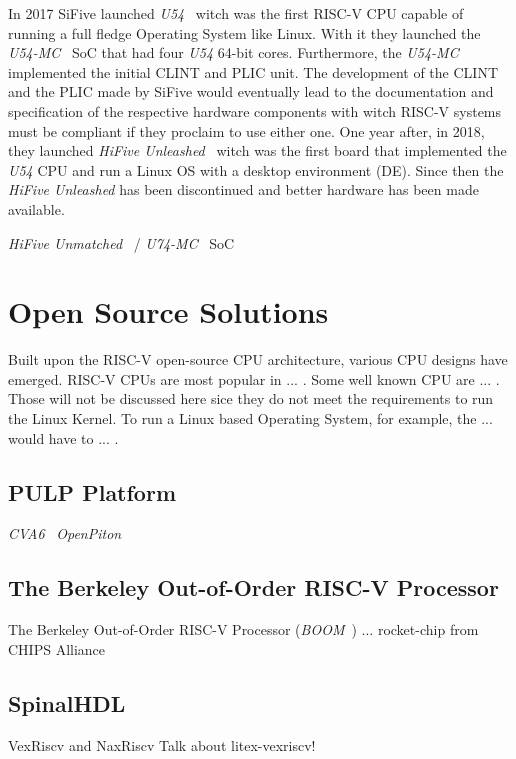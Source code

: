 In 2017 SiFive launched \textit{U54}~\cite{u54} witch was the first RISC-V CPU capable of running a full fledge Operating System like Linux. With it they launched the \textit{U54-MC}~\cite{u54-mc} SoC that had four \textit{U54} 64-bit cores. Furthermore, the \textit{U54-MC} implemented the initial CLINT and PLIC unit. The development of the CLINT and the PLIC made by SiFive would eventually lead to the documentation and specification of the respective hardware components with witch RISC-V systems must be compliant if they proclaim to use either one. One year after, in 2018, they launched \textit{HiFive Unleashed}~\cite{hifive_unleashed} witch was the first board that implemented the \textit{U54} CPU and run a Linux OS with a desktop environment (DE). Since then the \textit{HiFive Unleashed} has been discontinued and better hardware has been made available.

\textit{HiFive Unmatched}~\cite{hifive_unmatched} / \textit{U74-MC}~\cite{u74-mc} SoC

\section{Open Source Solutions}
Built upon the RISC-V open-source CPU architecture, various CPU designs have emerged. RISC-V CPUs are most popular in ... . Some well known CPU are ... . Those will not be discussed here sice they do not meet the requirements to run the Linux Kernel. To run a Linux based Operating System, for example, the ... would have to ... .

\subsection{PULP Platform}
\textit{CVA6}~\cite{zaruba2019cost} \textit{OpenPiton}~\cite{Balkind:2016:OOS:2872362.2872414}

\subsection{The Berkeley Out-of-Order RISC-V Processor}
The Berkeley Out-of-Order RISC-V Processor (\textit{BOOM}~\cite{zhaosonicboom}) ... 
rocket-chip from CHIPS Alliance

\subsection{SpinalHDL}
VexRiscv and NaxRiscv
Talk about litex-vexriscv!



